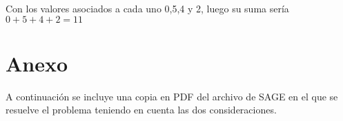 \documentclass[11pt]{article}
\begin{document}
Con los valores asociados a cada uno 0,5,4 y 2, luego su suma sería $0+5+4+2=11$





\section*{Anexo}
A continuación se incluye una copia en PDF del archivo de SAGE en el que se resuelve el problema teniendo en cuenta las dos consideraciones.
\label{pdf:anexo}
\end{document}
